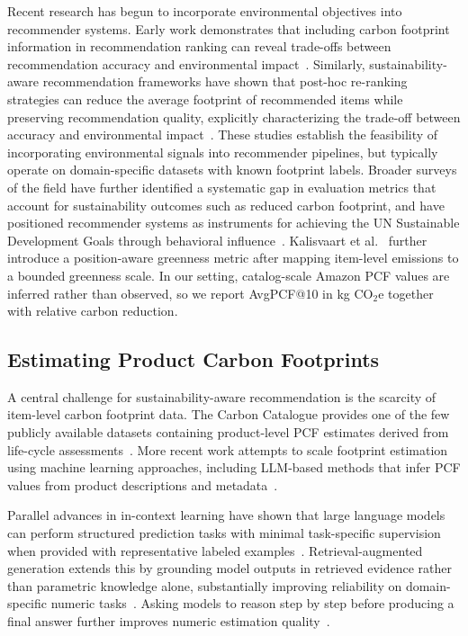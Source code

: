 \documentclass[11pt]{article}
\begin{document}
Recent research has begun to incorporate environmental objectives into recommender systems.
Early work demonstrates that including carbon footprint information in recommendation
ranking can reveal trade-offs between recommendation accuracy and environmental
impact~\cite{spillo2023sustainabilityaware, ecoa2026, vicenti2026pcfllm}. Similarly,
sustainability-aware recommendation frameworks have shown that post-hoc re-ranking strategies can reduce the average footprint of recommended items
while preserving recommendation quality, explicitly characterizing the trade-off between
accuracy and environmental impact~\cite{kalisvaart2025greenerrec}. These studies
establish the feasibility of incorporating environmental signals into recommender pipelines,
but typically operate on domain-specific datasets with known footprint labels. Broader
surveys of the field have further identified a systematic gap in evaluation metrics that
account for sustainability outcomes such as reduced carbon footprint, and have positioned
recommender systems as instruments for achieving the UN Sustainable Development Goals
through behavioral influence~\cite{felfernig2023sustainability}.
Kalisvaart et al.~\cite{kalisvaart2025greenerrec} further introduce a position-aware
greenness metric after mapping item-level emissions to a bounded greenness scale. In our
setting, catalog-scale Amazon PCF values are inferred rather than observed, so we report
AvgPCF@10 in kg CO$_2$e together with relative carbon reduction.

\subsection{Estimating Product Carbon Footprints}

A central challenge for sustainability-aware recommendation is the scarcity of item-level
carbon footprint data. The Carbon Catalogue provides one of the few publicly available
datasets containing product-level PCF estimates derived from life-cycle
assessments~\cite{meinrenken2022carboncatalogue}. More recent work attempts to scale
footprint estimation using machine learning approaches, including LLM-based methods that
infer PCF values from product descriptions and metadata~\cite{vicenti2026pcfllm, ecoa2026}.

Parallel advances in in-context learning have shown that large language models can perform
structured prediction tasks with minimal task-specific supervision when provided with
representative labeled examples~\cite{dong2022icl, brown2020gpt3}. Retrieval-augmented
generation extends this by grounding model outputs in retrieved evidence rather than
parametric knowledge alone, substantially improving reliability on domain-specific numeric
tasks~\cite{gao2023ragsurvey}. Asking models to reason step by step before producing a
final answer further improves numeric estimation quality~\cite{wei2022cot}.
\end{document}

